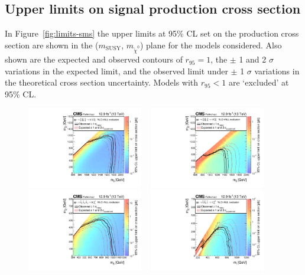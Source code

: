 \subsection{Upper limits on signal production cross section}
\label{sec:limits-sms}
In Figure~\ref{fig:limits-sms} the upper limits at 95\% CL set on the production cross section are shown
in the ($m_{\text{SUSY}}$, $m_{\tilde{\chi}^{0}}$) plane for the models considered.
Also shown are the expected and observed contours of $r_{95} = 1$, 
the $\pm$ 1 and 2 $\sigma$ variations in the expected limit, and the observed limit under $\pm$ 1 $\sigma$ 
variations in the theoretical cross section uncertainty. Models with $r_{95} < 1$ are
`excluded' at 95\% CL.

\begin{figure}[thp!]
  \begin{center}
    \includegraphics[width=0.45\textwidth]{./Figures/statisticalResults/SUS16T1bbbbXSEC.pdf} ~
    \includegraphics[width=0.45\textwidth]{./Figures/statisticalResults/SUS16T1ttttXSEC.pdf} \\
    \includegraphics[width=0.45\textwidth]{./Figures/statisticalResults/SUS16T2bbXSEC.pdf} ~
    \includegraphics[width=0.45\textwidth]{./Figures/statisticalResults/SUS16T2ttXSEC.pdf} 

\end{center}
\end{figure}
